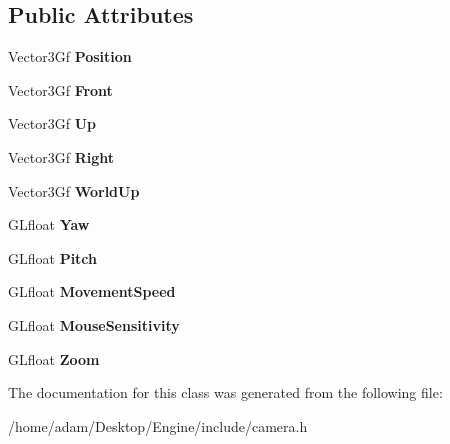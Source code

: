 \subsection*{Public Attributes}
\begin{DoxyCompactItemize}
\item 
\mbox{\label{classCamera_ab24ae04e34fbcc1057be0ccca9ce5d76}} 
Vector3\+Gf {\bfseries Position}
\item 
\mbox{\label{classCamera_a7ead2f5965525cc388b16baaf7730e2b}} 
Vector3\+Gf {\bfseries Front}
\item 
\mbox{\label{classCamera_a034f566309116c5e31bf31fc3ae668a5}} 
Vector3\+Gf {\bfseries Up}
\item 
\mbox{\label{classCamera_ab720984bfc18071ec793fceb0174f6e5}} 
Vector3\+Gf {\bfseries Right}
\item 
\mbox{\label{classCamera_a37ce2216fcfd5a5f58913ebd320981aa}} 
Vector3\+Gf {\bfseries World\+Up}
\item 
\mbox{\label{classCamera_abf27283ca0ccc51bae8446796ffc6b44}} 
G\+Lfloat {\bfseries Yaw}
\item 
\mbox{\label{classCamera_ae6afc2507f67baf4390405cfda1d1e87}} 
G\+Lfloat {\bfseries Pitch}
\item 
\mbox{\label{classCamera_a93ea63669df9617a6f63fa09e74a01a9}} 
G\+Lfloat {\bfseries Movement\+Speed}
\item 
\mbox{\label{classCamera_adc61747052dc386a4ab8e110a1fbc628}} 
G\+Lfloat {\bfseries Mouse\+Sensitivity}
\item 
\mbox{\label{classCamera_a1078d85d2e18bdc32291aabfcdda710a}} 
G\+Lfloat {\bfseries Zoom}
\end{DoxyCompactItemize}


The documentation for this class was generated from the following file\+:\begin{DoxyCompactItemize}
\item 
/home/adam/\+Desktop/\+Engine/include/camera.\+h\end{DoxyCompactItemize}
